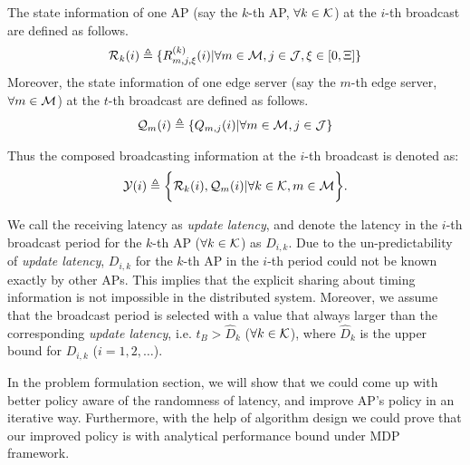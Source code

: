 The state information of one AP (say the $k$-th AP, $\forall k\in\mathcal{K}$) at the $i$-th broadcast are defined as follows.
\begin{align}
    \mathcal{R}_{k}(i) \triangleq \{R^{(k)}_{m,j,\xi}(i) | \forall m\in\mathcal{M}, j\in\mathcal{J}, \xi \in [0,\Xi]\}
\end{align}
Moreover, the state information of one edge server (say the $m$-th edge server, $\forall m\in\mathcal{M}$) at the $t$-th broadcast are defined as follows.
\begin{align}
    \mathcal{Q}_{m}(i) \triangleq \{Q_{m,j}(i) | \forall m\in\mathcal{M}, j\in\mathcal{J}\}
\end{align}

Thus the composed broadcasting information at the $i$-th broadcast is denoted as:
\begin{align}
    \mathcal{Y}(i) \triangleq
        \bigg\{
            \mathcal{R}_{k}(i), \mathcal{Q}_{m}(i) | \forall k\in\mathcal{K}, m\in\mathcal{M}
        \bigg\}.
\end{align}

We call the receiving latency as \emph{update latency}, and denote the latency in the $i$-th broadcast period for the $k$-th AP ($\forall k\in\mathcal{K}$) as $D_{i,k}$.
Due to the un-predictability of \emph{update latency}, $D_{i,k}$ for the $k$-th AP in the $i$-th period could not be known exactly by other APs. This implies that the explicit sharing about timing information is not impossible in the distributed system.
Moreover, we assume that the broadcast period is selected with a value that always larger than the corresponding \emph{update latency}, i.e. $t_B > \hat{D}_k$ ($\forall k\in\mathcal{K}$), where $\hat{D}_k$ is the upper bound for $D_{i,k}$ ($i=1,2,\dots$).

In the problem formulation section, we will show that we could come up with better policy aware of the randomness of latency, and improve AP's policy in an iterative way.
Furthermore, with the help of algorithm design we could prove that our improved policy is with analytical performance bound under MDP framework.


